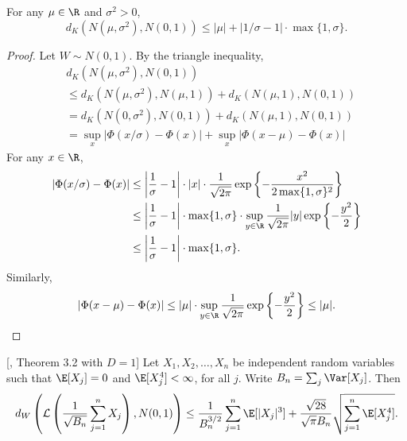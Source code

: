 \begin{lemma}\label{lem:dK_normal}
  For any $\mu\in \R$ and $\sigma^2 > 0$,
  \[d_{K}(N(\mu, \sigma^2), N(0, 1))\le |\mu| + |1/\sigma - 1|\cdot \max\{1, \sigma\}.\]
\end{lemma}
\begin{proof}
  Let $W\sim N(0, 1)$. By the triangle inequality,
  \begin{align*}
    &d_{K}(N(\mu, \sigma^2), N(0, 1))\\
    &\le d_{K}(N(\mu, \sigma^2), N(\mu, 1)) + d_{K}(N(\mu, 1), N(0, 1))\\
    &= d_{K}(N(0, \sigma^2), N(0, 1)) + d_{K}(N(\mu, 1), N(0, 1))\\
    & = \sup_{x}|\Phi(x / \sigma) - \Phi(x)| + \sup_{x}|\Phi(x - \mu) - \Phi(x)|
  \end{align*}
  For any $x\in \R$,
  \begin{align*}
    |\Phi(x / \sigma) - \Phi(x)| & \le \bigg|\frac{1}{\sigma} - 1\bigg|\cdot |x| \cdot \frac{1}{\sqrt{2\pi}}\exp\left\{-\frac{x^2}{2\max\{1, \sigma\}^2}\right\}\\
                                 & \le \bigg|\frac{1}{\sigma} - 1\bigg|\cdot \max\{1, \sigma\} \cdot \sup_{y\in \R}\frac{1}{\sqrt{2\pi}}|y|\exp\left\{-\frac{y^2}{2}\right\}\\
    & \le \bigg|\frac{1}{\sigma} - 1\bigg|\cdot \max\{1, \sigma\}.
  \end{align*}
  Similarly,
  \[|\Phi(x - \mu) - \Phi(x)|\le |\mu| \cdot \sup_{y\in \R}\frac{1}{\sqrt{2\pi}}\exp\left\{-\frac{y^2}{2}\right\}\le |\mu|.\]
\end{proof}

\begin{lemma}\label{lem:dW_CLT}[\citet{ross2011fundamentals}, Theorem 3.2 with $D = 1$]
  Let $X_1, X_2, \ldots, X_{n}$ be independent random variables such that $\E[X_j] = 0$ and $\E[X_j^4] <\infty$, for all $j$. Write $B_{n} = \sum_{j}\Var[X_j]$. Then
  \[d_{W}\left(\mathcal{L}\left(\frac{1}{\sqrt{B_n}}\sum_{j=1}^{n}X_j\right), N(0, 1)\right)\le \frac{1}{B_n^{3/2}}\sum_{j=1}^{n}\E[|X_j|^3] + \frac{\sqrt{28}}{\sqrt{\pi}B_n}\sqrt{\sum_{j=1}^{n}\E[X_j^4]}.\]
\end{lemma}


